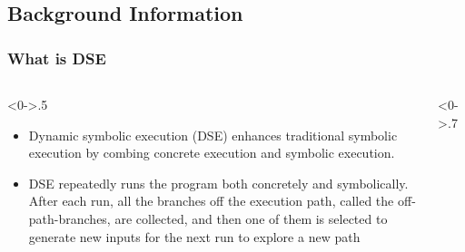 \documentclass[9pt,aspectratio=43,mathserif,table]{beamer}
\begin{document}
\subsection{Background Information}
\begin{frame}
	\frametitle<presentation>{What is DSE}
	\begin{columns}[T] %
		\begin{column}<0->{.5\textwidth}
			\begin{itemize}
				\item Dynamic symbolic execution (DSE) enhances
				      traditional symbolic execution by combing concrete execution and symbolic execution.
				\item DSE repeatedly runs the program both concretely and symbolically. After each run,
				      all the branches off the execution path, called the off-path-branches, are collected,
				      and then one of them is selected to generate new inputs for the next run to explore a new
				      path
			\end{itemize}
		\end{column}%
		\hfill%
		\begin{column}<0->{.7\textwidth}
			\begin{figure}[thpb]
				\centering
				\caption{DSE}
				\label{fig:dse}
			\end{figure}
		\end{column}%
	\end{columns}
\end{frame}
\end{document}
